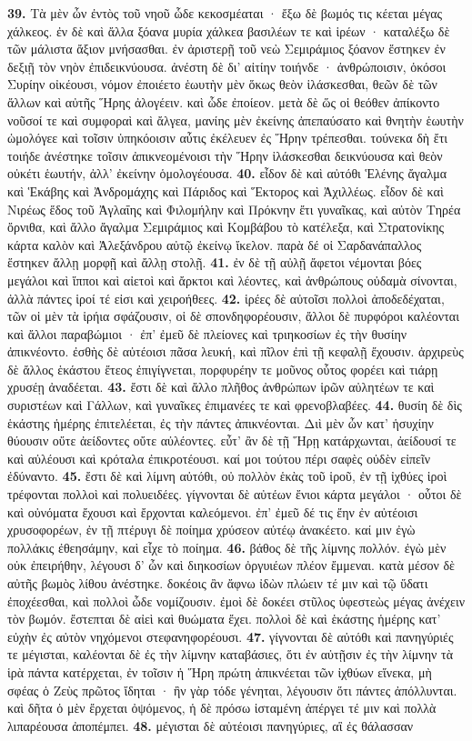 \documentclass[a4paper, 11pt, oneside, polutonikogreek, german]{article}
\begin{document}
\textbf{39.} Τὰ μὲν ὦν ἐντὸς τοῦ νηοῦ ὧδε κεκοσμέαται · ἔξω δὲ βωμός τις κέεται μέγας χάλκεος. ἐν δὲ καὶ ἄλλα ξόανα μυρία χάλκεα βασιλέων τε καὶ ἱρέων · καταλέξω δὲ τῶν μάλιστα ἄξιον μνήσασθαι. ἐν ἀριστερῇ τοῦ νεὼ Σεμιράμιος ξόανον ἕστηκεν ἐν δεξιῇ τὸν νηὸν ἐπιδεικνύουσα. ἀνέστη δὲ δι' αἰτίην τοιήνδε · ἀνθρώποισιν, ὁκόσοι Συρίην οἰκέουσι, νόμον ἐποιέετο ἑωυτὴν μὲν ὅκως θεὸν ἱλάσκεσθαι, θεῶν δὲ τῶν ἄλλων καὶ αὐτῆς Ἥρης ἀλογέειν. καὶ ὧδε ἐποίεον. μετὰ δὲ ὥς οἱ θεόθεν ἀπίκοντο νοῦσοί τε καὶ συμφοραὶ καὶ ἄλγεα, μανίης μὲν ἐκείνης ἀπεπαύσατο καὶ θνητὴν ἑωυτὴν ὡμολόγεε καὶ τοῖσιν ὑπηκόοισιν αὖτις ἐκέλευεν ἐς Ἥρην τρέπεσθαι. τούνεκα δὴ ἔτι τοιήδε ἀνέστηκε τοῖσιν ἀπικνεομένοισι τὴν Ἥρην ἱλάσκεσθαι δεικνύουσα καὶ θεὸν οὐκέτι ἑωυτήν, ἀλλ' ἐκείνην ὁμολογέουσα. \textbf{40.} εἶδον δὲ καὶ αὐτόθι Ἑλένης ἄγαλμα καὶ Ἑκάβης καὶ Ἀνδρομάχης καὶ Πάριδος καὶ Ἕκτορος καὶ Ἀχιλλέως. εἶδον δὲ καὶ Νιρέως ἕδος τοῦ Ἀγλαΐης καὶ Φιλομήλην καὶ Πρόκνην ἔτι γυναῖκας, καὶ αὐτὸν Τηρέα ὄρνιθα, καὶ ἄλλο ἄγαλμα Σεμιράμιος καὶ Κομβάβου τὸ κατέλεξα, καὶ Στρατονίκης κάρτα καλὸν καὶ Ἀλεξάνδρου αὐτῷ ἐκείνῳ ἴκελον. παρὰ δέ οἱ Σαρδανάπαλλος ἕστηκεν ἄλλῃ μορφῇ καὶ ἄλλῃ στολῇ. \textbf{41.} ἐν δὲ τῇ αὐλῇ ἄφετοι νέμονται βόες μεγάλοι καὶ ἵπποι καὶ αἰετοὶ καὶ ἄρκτοι καὶ λέοντες, καὶ ἀνθρώπους οὐδαμὰ σίνονται, ἀλλὰ πάντες ἱροί τέ εἰσι καὶ χειροήθεες. \textbf{42.} ἱρέες δὲ αὐτοῖσι πολλοὶ ἀποδεδέχαται, τῶν οἱ μὲν τὰ ἱρήια σφάζουσιν, οἱ δὲ σπονδηφορέουσιν, ἄλλοι δὲ πυρφόροι καλέονται καὶ ἄλλοι παραβώμιοι · ἐπ' ἐμεῦ δὲ πλείονες καὶ τριηκοσίων ἐς τὴν θυσίην ἀπικνέοντο. ἐσθὴς δὲ αὐτέοισι πᾶσα λευκή, καὶ πῖλον ἐπὶ τῇ κεφαλῇ ἔχουσιν. ἀρχιρεὺς δὲ ἄλλος ἑκάστου ἔτεος ἐπιγίγνεται, πορφυρέην τε μοῦνος οὗτος φορέει καὶ τιάρῃ χρυσέῃ ἀναδέεται. \textbf{43.} ἔστι δὲ καὶ ἄλλο πλῆθος ἀνθρώπων ἱρῶν αὐλητέων τε καὶ συριστέων καὶ Γάλλων, καὶ γυναῖκες ἐπιμανέες τε καὶ φρενοβλαβέες. \textbf{44.} θυσίη δὲ δὶς ἑκάστης ἡμέρης ἐπιτελέεται, ἐς τὴν πάντες ἀπικνέονται. Διὶ μὲν ὦν κατ' ἡσυχίην θύουσιν οὔτε ἀείδοντες οὔτε αὐλέοντες. εὖτ' ἂν δὲ τῇ Ἥρῃ κατάρχωνται, ἀείδουσί τε καὶ αὐλέουσι καὶ κρόταλα ἐπικροτέουσι. καί μοι τούτου πέρι σαφὲς οὐδὲν εἰπεῖν ἐδύναντο. \textbf{45.} ἔστι δὲ καὶ λίμνη αὐτόθι, οὐ πολλὸν ἑκὰς τοῦ ἱροῦ, ἐν τῇ ἰχθύες ἱροὶ τρέφονται πολλοὶ καὶ πολυειδέες. γίγνονται δὲ αὐτέων ἔνιοι κάρτα μεγάλοι · οὗτοι δὲ καὶ οὐνόματα ἔχουσι καὶ ἔρχονται καλεόμενοι. ἐπ' ἐμεῦ δέ τις ἔην ἐν αὐτέοισι χρυσοφορέων, ἐν τῇ πτέρυγι δὲ ποίημα χρύσεον αὐτέῳ ἀνακέετο. καί μιν ἐγὼ πολλάκις ἐθεησάμην, καὶ εἶχε τὸ ποίημα. \textbf{46.} βάθος δὲ τῆς λίμνης πολλόν. ἐγὼ μὲν οὐκ ἐπειρήθην, λέγουσι δ' ὦν καὶ διηκοσίων ὀργυιέων πλέον ἔμμεναι. κατὰ μέσον δὲ αὐτῆς βωμὸς λίθου ἀνέστηκε. δοκέοις ἂν ἄφνω ἰδὼν πλώειν τέ μιν καὶ τῷ ὕδατι ἐποχέεσθαι, καὶ πολλοὶ ὧδε νομίζουσιν. ἐμοὶ δὲ δοκέει στῦλος ὑφεστεὼς μέγας ἀνέχειν τὸν βωμόν. ἔστεπται δὲ αἰεὶ καὶ θυώματα ἔχει. πολλοὶ δὲ καὶ ἑκάστης ἡμέρης κατ' εὐχὴν ἐς αὐτὸν νηχόμενοι στεφανηφορέουσι. \textbf{47.} γίγνονται δὲ αὐτόθι καὶ πανηγύριές τε μέγισται, καλέονται δὲ ἐς τὴν λίμνην καταβάσιες, ὅτι ἐν αὐτῇσιν ἐς τὴν λίμνην τὰ ἱρὰ πάντα κατέρχεται, ἐν τοῖσιν ἡ Ἥρη πρώτη ἀπικνέεται τῶν ἰχθύων εἵνεκα, μὴ σφέας ὁ Ζεὺς πρῶτος ἴδηται · ἢν γὰρ τόδε γένηται, λέγουσιν ὅτι πάντες ἀπόλλυνται. καὶ δῆτα ὁ μὲν ἔρχεται ὀψόμενος, ἡ δὲ πρόσω ἱσταμένη ἀπέργει τέ μιν καὶ πολλὰ λιπαρέουσα ἀποπέμπει. \textbf{48.} μέγισται δὲ αὐτέοισι πανηγύριες, αἳ ἐς θάλασσαν 
\end{document}
